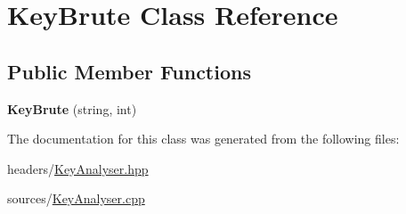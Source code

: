 \hypertarget{classKeyBrute}{}\section{Key\+Brute Class Reference}
\label{classKeyBrute}
\subsection*{Public Member Functions}
\begin{DoxyCompactItemize}
\item 
\mbox{\label{classKeyBrute_abfeab3a4796354e73b19d1c0064124ac}} 
{\bfseries Key\+Brute} (string, int)
\end{DoxyCompactItemize}


The documentation for this class was generated from the following files\+:\begin{DoxyCompactItemize}
\item 
headers/\hyperlink{KeyAnalyser_8hpp}{Key\+Analyser.\+hpp}\item 
sources/\hyperlink{KeyAnalyser_8cpp}{Key\+Analyser.\+cpp}\end{DoxyCompactItemize}
